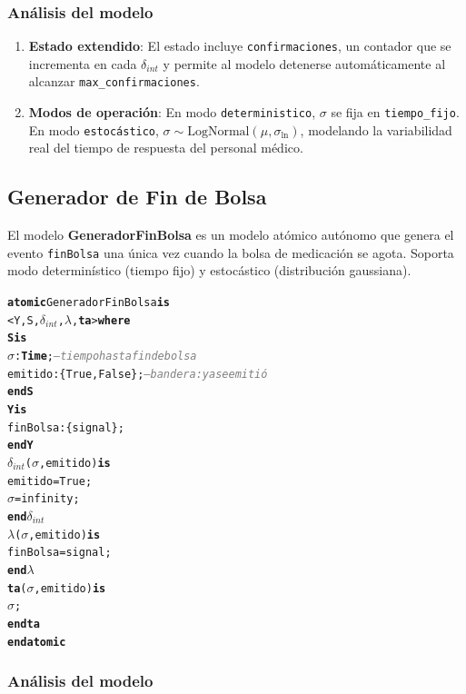 \documentclass[12pt,a4paper]{article}
\newcommand{\kw}[1]{\textbf{#1}}
\newcommand{\cmlTime}{\textbf{Time}}
\newcommand{\cmlsigma}{$\sigma$}
\newcommand{\dint}{$\delta_{\mathit{int}}$}
\newcommand{\clambda}{$\lambda$}
\newcommand{\cmlta}{\textbf{ta}}
\newcommand{\cmlcomment}[1]{\textit{\textcolor{gray}{#1}}}
\newenvironment{cmldevs}{%
  \begin{alltt}\small%
}{%
  \end{alltt}%
}
\begin{document}
\subsubsection*{Análisis del modelo}

\begin{enumerate}
    \item \textbf{Estado extendido}: El estado incluye
    \texttt{confirmaciones}, un contador que se incrementa en cada
    $\delta_{\mathit{int}}$ y permite al modelo detenerse
    automáticamente al alcanzar \texttt{max\_confirmaciones}.

    \item \textbf{Modos de operación}: En modo \texttt{deterministico},
    $\sigma$ se fija en \texttt{tiempo\_fijo}.  En modo
    \texttt{estocástico}, $\sigma \sim \text{LogNormal}(\mu,
    \sigma_{\ln})$, modelando la variabilidad real del tiempo de
    respuesta del personal médico.
\end{enumerate}

\subsection{Generador de Fin de Bolsa}

El modelo \textbf{GeneradorFinBolsa} es un modelo atómico autónomo que
genera el evento \texttt{finBolsa} una única vez cuando la bolsa de
medicación se agota.  Soporta modo determinístico (tiempo fijo) y
estocástico (distribución gaussiana).

\begin{center}
\begin{cmldevs}
\kw{atomic} GeneradorFinBolsa \kw{is}
    <Y, S, \dint{}, \clambda{}, \cmlta{}> \kw{where}
\kw{S is}
    \cmlsigma{}  : \cmlTime{};   \cmlcomment{-- tiempo hasta fin de bolsa}
    emitido : \{True, False\}; \cmlcomment{-- bandera: ya se emitió}
\kw{end S}
\kw{Y is}
    finBolsa : \{signal\};
\kw{end Y}
\dint{}(\cmlsigma{}, emitido) \kw{is}
    emitido = True;
    \cmlsigma{} = infinity;
\kw{end} \dint{}
\clambda{}(\cmlsigma{}, emitido) \kw{is}
    finBolsa = signal;
\kw{end} \clambda{}
\cmlta{}(\cmlsigma{}, emitido) \kw{is}
    \cmlsigma{};
\kw{end} \cmlta{}
\kw{end atomic}
\end{cmldevs}
\label{fig:generador-fin-bolsa}
\end{center}

\subsubsection*{Análisis del modelo}
\end{document}
